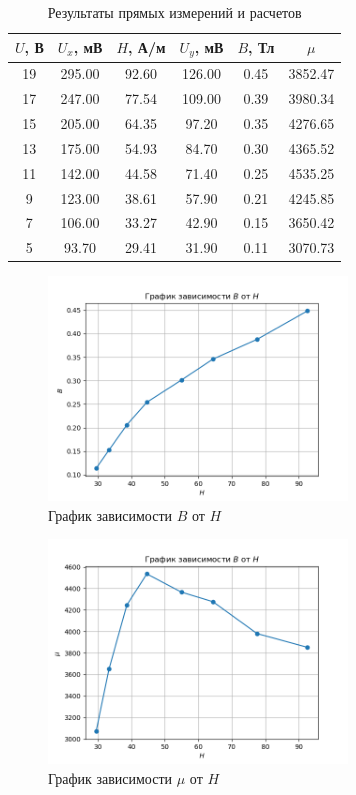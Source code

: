 \documentclass{article}%
\begin{document}
\begin{table}[h!]%
\centering%
\begin{tabular}{|c|c|c|c|c|c|}%
\hline%
$U$, В&$U_x$, мВ&$H$, А/м&$U_y$, мВ&$B$, Тл&$\mu$\\%
\hline%
19&295.00&92.60&126.00&0.45&3852.47\\%
\hline%
17&247.00&77.54&109.00&0.39&3980.34\\%
\hline%
15&205.00&64.35&97.20&0.35&4276.65\\%
\hline%
13&175.00&54.93&84.70&0.30&4365.52\\%
\hline%
11&142.00&44.58&71.40&0.25&4535.25\\%
\hline%
9&123.00&38.61&57.90&0.21&4245.85\\%
\hline%
7&106.00&33.27&42.90&0.15&3650.42\\%
\hline%
5&93.70&29.41&31.90&0.11&3070.73\\%
\hline%
\end{tabular}%
\caption{Результаты прямых измерений и расчетов}%
\end{table}

%


\begin{figure}[h!]%
\centering%
\includegraphics[width=300px]{B_vs_H.png}%
\caption{График зависимости $B$ от $H$}%
\end{figure}

%


\begin{figure}[h!]%
\centering%
\includegraphics[width=300px]{mu_vs_H.png}%
\caption{График зависимости $\mu$ от $H$}%
\end{figure}
\end{document}
